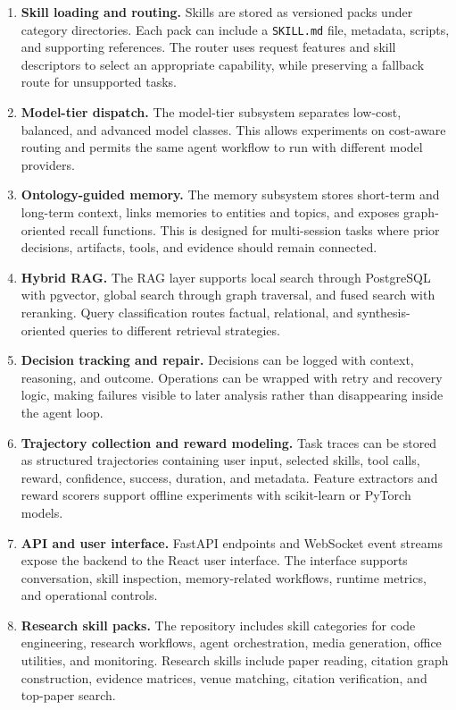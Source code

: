 \documentclass[preprint,12pt,a4paper]{elsarticle}
\begin{document}
\begin{enumerate}[leftmargin=*]
\item \textbf{Skill loading and routing.} Skills are stored as versioned packs under category directories. Each pack can include a \texttt{SKILL.md} file, metadata, scripts, and supporting references. The router uses request features and skill descriptors to select an appropriate capability, while preserving a fallback route for unsupported tasks.

\item \textbf{Model-tier dispatch.} The model-tier subsystem separates low-cost, balanced, and advanced model classes. This allows experiments on cost-aware routing and permits the same agent workflow to run with different model providers.

\item \textbf{Ontology-guided memory.} The memory subsystem stores short-term and long-term context, links memories to entities and topics, and exposes graph-oriented recall functions. This is designed for multi-session tasks where prior decisions, artifacts, tools, and evidence should remain connected.

\item \textbf{Hybrid RAG.} The RAG layer supports local search through PostgreSQL with pgvector, global search through graph traversal, and fused search with reranking. Query classification routes factual, relational, and synthesis-oriented queries to different retrieval strategies.

\item \textbf{Decision tracking and repair.} Decisions can be logged with context, reasoning, and outcome. Operations can be wrapped with retry and recovery logic, making failures visible to later analysis rather than disappearing inside the agent loop.

\item \textbf{Trajectory collection and reward modeling.} Task traces can be stored as structured trajectories containing user input, selected skills, tool calls, reward, confidence, success, duration, and metadata. Feature extractors and reward scorers support offline experiments with scikit-learn or PyTorch models.

\item \textbf{API and user interface.} FastAPI endpoints and WebSocket event streams expose the backend to the React user interface. The interface supports conversation, skill inspection, memory-related workflows, runtime metrics, and operational controls.

\item \textbf{Research skill packs.} The repository includes skill categories for code engineering, research workflows, agent orchestration, media generation, office utilities, and monitoring. Research skills include paper reading, citation graph construction, evidence matrices, venue matching, citation verification, and top-paper search.
\end{enumerate}
\end{document}
